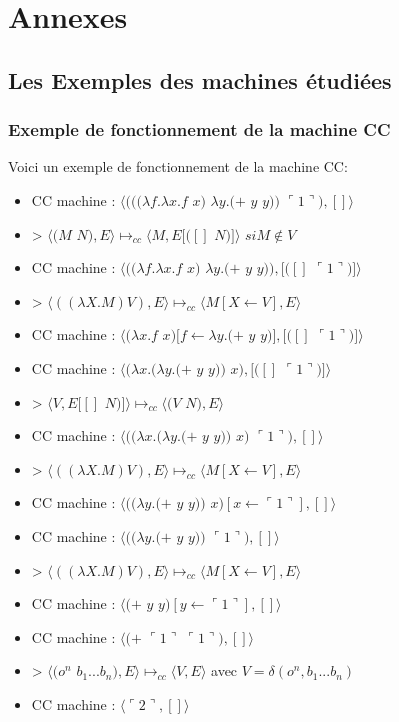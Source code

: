 \documentclass[10pt,a4paper]{article}
\begin{document}
		\newpage
		
		\section{Annexes}
			\subsection{Les Exemples des machines étudiées}
				\subsubsection{Exemple de fonctionnement de la machine CC}\label{CC}
			
					Voici un exemple de fonctionnement de la machine CC:
					
					\begin{itemize}
						\item[] CC machine : $\langle(((\lambda f.\lambda x.f$ $x)$ $\lambda y.(+$ $y$ $y))$ $\ulcorner 1\urcorner),[]\rangle$
						\item[] > $\langle(M$ $N),E\rangle \longmapsto_{cc} \langle M,E[([]$ $N)]\rangle$ $si M \notin V$
						\item[] CC machine : $\langle((\lambda f.\lambda x.f$ $x)$ $\lambda y.(+$ $y$ $y)),[([]$ $\ulcorner 1\urcorner)]\rangle$
						\item[] > $\langle((\lambda X.M) V),E\rangle \longmapsto_{cc} \langle M[X\longleftarrow V],E\rangle$
						\item[] CC machine : $\langle(\lambda x.f$ $x)[f \leftarrow \lambda y.(+$ $y$ $y)],[([]$ $\ulcorner 1\urcorner)]\rangle$
						\item[] CC machine : $\langle(\lambda x.(\lambda y.(+$ $y$ $y))$ $x),[([]$ $\ulcorner 1\urcorner)]\rangle$
						\item[] > $\langle V,E[[]$ $N)]\rangle \longmapsto_{cc} \langle(V$ $N),E\rangle$ 
						\item[] CC machine : $\langle((\lambda x.(\lambda y.(+$ $y$ $y))$ $x)$ $\ulcorner 1\urcorner),[]\rangle$
						\item[] > $\langle((\lambda X.M) V),E\rangle \longmapsto_{cc} \langle M[X\longleftarrow V],E\rangle$
						\item[] CC machine : $\langle((\lambda y.(+$ $y$ $y))$ $x)[x \leftarrow \ulcorner 1\urcorner],[]\rangle$
						\item[] CC machine : $\langle((\lambda y.(+$ $y$ $y))$ $\ulcorner 1\urcorner),[]\rangle$
						\item[] > $\langle((\lambda X.M) V),E\rangle \longmapsto_{cc} \langle M[X\longleftarrow V],E\rangle$
						\item[] CC machine : $\langle(+$ $y$ $y)[y \leftarrow \ulcorner 1\urcorner],[]\rangle$
						\item[] CC machine : $\langle(+$ $\ulcorner 1\urcorner$ $\ulcorner 1\urcorner),[]\rangle$
						\item[] > $\langle(o^{n}$ $b_{1}...b_{n}),E\rangle \longmapsto_{cc}  \langle V,E\rangle$ avec $V = \delta(o^{n},b_{1}...b_{n})$
						\item[] CC machine : $\langle\ulcorner 2\urcorner,[]\rangle$
					\end{itemize}
				
\end{document}
